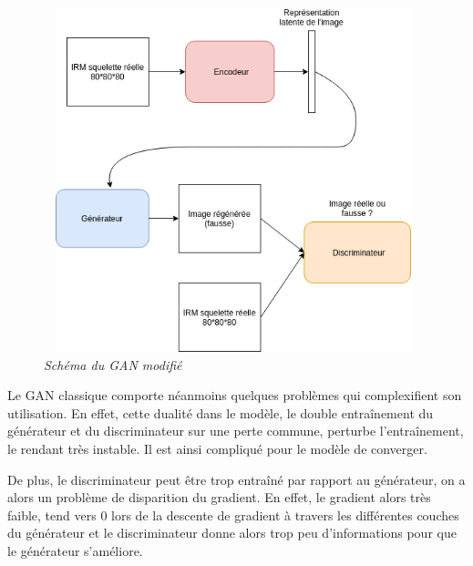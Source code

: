 \documentclass[12pt, oneside, a4paper, titlepage]{article}
\begin{document}
\vspace{1cm}
\begin{figure}[H]
    \centering
\includegraphics[width=11cm, height=10cm]{schemaGan.png}
    \caption{\textit{Schéma du GAN modifié }}
    \label{fig:Ganmodif}
\end{figure}

\vspace{1cm}

Le GAN classique comporte néanmoins quelques problèmes qui complexifient son utilisation. 
En effet, cette dualité dans le modèle, le double entraînement du générateur et du discriminateur sur une perte commune, perturbe l'entraînement, le rendant très instable. Il est ainsi compliqué pour le modèle de converger. 

De plus, le discriminateur peut être trop entraîné par rapport au générateur, on a alors un problème de disparition du gradient. En effet, le gradient alors très faible, tend vers 0 lors de la descente de gradient à travers les différentes couches du générateur et le discriminateur donne alors trop peu d'informations pour que le générateur s'améliore.
\end{document}
